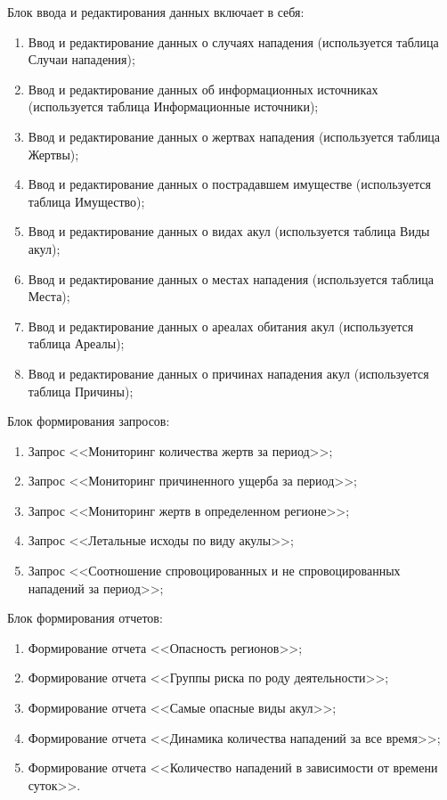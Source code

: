 \documentclass[russian,utf8,simple,emptystyle]{eskdtext}
\begin{document}
Блок ввода и редактирования данных включает в себя:
\begin{enumerate}
\item Ввод и редактирование данных о  случаях нападения (используется таблица Случаи нападения);
\item Ввод и редактирование данных об информационных источниках (используется таблица Информационные источники);
\item Ввод и редактирование данных о жертвах нападения (используется таблица Жертвы);
\item Ввод и редактирование данных о пострадавшем имуществе (используется таблица Имущество);
\item Ввод и редактирование данных о видах акул (используется таблица Виды акул);
\item Ввод и редактирование данных о местах нападения (используется таблица Места);
\item Ввод и редактирование данных о ареалах обитания акул (используется таблица Ареалы);
\item Ввод и редактирование данных о причинах нападения акул (используется таблица Причины);
\end{enumerate}

Блок формирования запросов:
\begin{enumerate}
	\item Запрос <<Мониторинг количества жертв за период>>;
	\item Запрос <<Мониторинг причиненного ущерба за период>>;
	\item Запрос <<Мониторинг жертв в определенном регионе>>;
	\item Запрос <<Летальные исходы по виду акулы>>;
	\item Запрос <<Соотношение спровоцированных и не спровоцированных нападений за период>>;
\end{enumerate}

Блок формирования отчетов:
\begin{enumerate}
	\item Формирование отчета <<Опасность регионов>>;
	\item Формирование отчета <<Группы риска по роду деятельности>>;
	\item Формирование отчета <<Самые опасные виды акул>>;
	\item Формирование отчета <<Динамика количества нападений за все время>>;
	\item Формирование отчета <<Количество нападений в зависимости от времени суток>>.
\end{enumerate}
\end{document}
